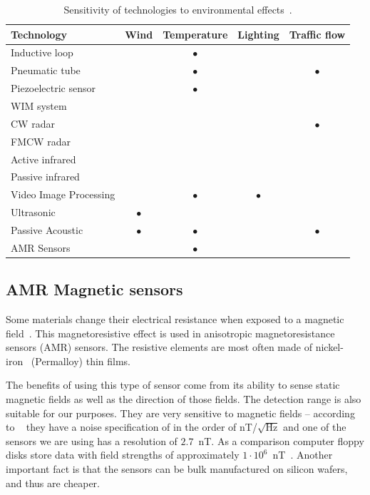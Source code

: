 \begin{table}[!f]
\centering
\caption[Sensitivity of technologies to environmental effects]{Sensitivity of technologies to environmental effects~\cite{path2007}.}
\begin{tabular}{lcccc}\toprule
 \textbf{Technology} 	& \textbf{Wind} & \textbf{Temperature} & \textbf{Lighting} & \textbf{Traffic flow}\\\midrule
 Inductive loop		& 		& $\bullet$	& 		&	\\
 Pneumatic tube		& 		& $\bullet$	&		& $\bullet$	\\
 Piezoelectric sensor	& 		& $\bullet$	&		&	\\
 WIM system		& 		& 		& 		& 	\\
 CW radar		& 		& 		& 		& $\bullet$ 	\\
 FMCW radar		& 		& 		& 		& 	\\
 Active infrared	& 		&		&		& 	\\
 Passive infrared	& 		& 		& 		& 	\\
 Video Image Processing & 		& $\bullet$	& $\bullet$	& 	\\
 Ultrasonic		& $\bullet$	&		&		& 	\\
 Passive Acoustic	& $\bullet$	& $\bullet$	& 		& $\bullet$	\\
 AMR Sensors		& 		& $\bullet$	& 		& 	\\ \bottomrule
\end{tabular} 
\label{tbl:enviromentaleffects}
\end{table} 


\subsection{AMR Magnetic sensors}

Some materials change their electrical resistance when exposed to a magnetic field~\cite{imego2006}. This magnetoresistive effect is used in anisotropic magnetoresistance sensors (AMR) sensors. The resistive elements are most often made of nickel-iron~\cite{caruso1998} (Permalloy) thin films.

The benefits of using this type of sensor come from its ability to sense static magnetic fields as well as the direction of those fields. The detection range is also suitable for our purposes. They are very sensitive to magnetic fields -- according to ~\cite{imego2006} they have a noise specification of in the order of  nT/$\sqrt{\text{Hz}}$ and one of the sensors we are using has a resolution of $2.7$~nT. As a comparison computer floppy disks store data with field strengths of approximately $1\cdot{}10^6$~nT~\cite{hmc2300}. Another important fact is that the sensors can be bulk manufactured on silicon wafers, and thus are cheaper.

